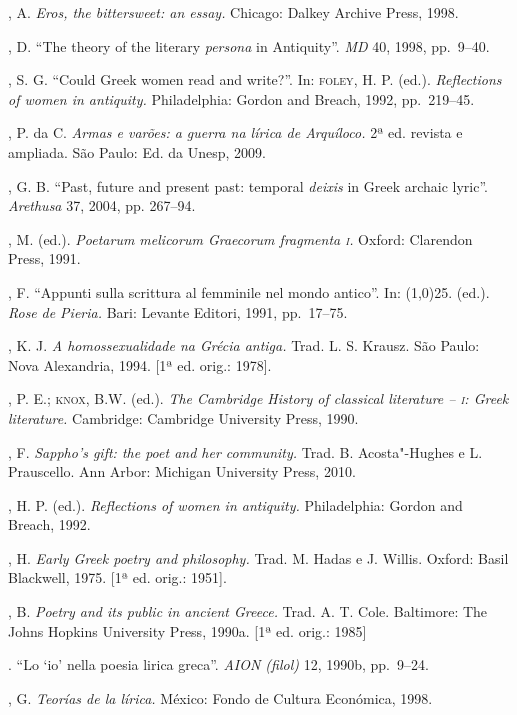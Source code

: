 \begin{bibliohedra}
, A. \textit{Eros, the bittersweet: an essay.} Chicago:
Dalkey Archive Press, 1998.

, D. “The theory of the literary \textit{persona} in Antiquity”.
\textit{MD} 40, 1998, pp.~9--40.

, S. G. “Could Greek women read and write?”. In: \textsc{foley}, H.
P. (ed.). \textit{Reflections of women in antiquity.} Philadelphia: Gordon and
Breach, 1992, pp.~219--45.

, P. da C. \textit{Armas e varões: a guerra na
lírica de Arquíloco.} 2ª ed. revista e ampliada. São Paulo: Ed. da Unesp, 2009.

, G. B. “Past, future and present past: temporal
\textit{deixis} in Greek archaic lyric”. \textit{Arethusa} 37, 2004, pp.
267--94.

, M. (ed.). \textit{Poetarum melicorum Graecorum fragmenta \textsc{i}.}
Oxford: Clarendon Press, 1991.

, F. “Appunti sulla scrittura al femminile nel mondo antico''.
In: \line(1,0){25}. (ed.). \textit{Rose} \textit{de Pieria.} Bari: Levante Editori,
1991, pp.~17--75.

, K. J.  \textit{A homossexualidade na Grécia antiga.}
Trad. L. S. Krausz. São Paulo: Nova Alexandria, 1994. [1ª ed. orig.: 1978].

, P. E.; \textsc{knox}, B.W. (ed.). \textit{The Cambridge History of
classical literature -- \textsc{i}: Greek literature.} Cambridge: Cambridge University
Press, 1990.

, F. \textit{Sappho’s gift: the poet and her community.} Trad.
B. Acosta"-Hughes e L. Prauscello. Ann Arbor: Michigan University Press, 2010.

, H. P. (ed.). \textit{Reflections of women in antiquity.}
Philadelphia: Gordon and Breach, 1992.

, H. \textit{Early Greek poetry and philosophy.} Trad. M. Hadas
e J. Willis. Oxford: Basil Blackwell, 1975. [1ª ed. orig.: 1951]. 

, B. \textit{Poetry and its public in ancient Greece.} Trad. A.
T. Cole. Baltimore: The Johns Hopkins University Press, 1990a.
[1ª ed. orig.: 1985]

\titidem. “Lo ‘io’ nella poesia lirica greca”. \textit{AION (filol)} 12,
1990b, pp.~9--24.

, G. \textit{Teorías de la lírica.} México: Fondo de
Cultura Económica, 1998.


\end{bibliohedra}
